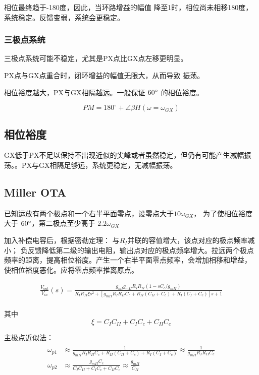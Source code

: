 \documentclass[cn,11pt,chinese,black,simple]{../elegantbook}
\begin{document}
相位最终趋于-180度，因此，当环路增益的幅值
降至1时，相位尚未相移180度，系统稳定。反馈变弱，系统会更稳定。

\subsubsection{三极点系统}

三极点系统可能不稳定，尤其是PX点比GX点左移更明显。

PX点与GX点重合时，闭环增益的幅值无限大，从而导致
振荡。

相位裕度越大，PX与GX相隔越远。一般保证 \(60^{\circ}\) 的相位裕度。

\[P M=180^{\circ}+\angle \beta H\left(\omega=\omega_{G X}\right)\]



\subsection{相位裕度}


GX低于PX不足以保持不出现近似的尖峰或者虽然稳定，但仍有可能产生减幅振荡。。PX与GX相隔足够远，系统更稳定，无减幅振荡。

\subsection{Miller OTA}

已知运放有两个极点和一个右半平面零点，设零点大于\(10 \omega_{GX}\)，  为了使相位裕度大于 \(60^{\circ}\)，第二极点至少高于 \(2.2 \omega_{GX}\)


加入补偿电容后，根据密勒定理：
与\(R_I\)并联的容值增大，该点对应的极点频率减小；
负反馈降低第二级的输出电阻，输出点对应的极点频率增大。拉远两个极点频率的距离，提高相位裕度。产生一个右半平面零点频率，会增加相移和增益，
使相位裕度恶化。应将零点频率推离原点。

\[
\begin{array}{l}
\frac{V_{o u t}}{V_{i n}}(s)=\frac{g_{m I} g_{m I I} R_{I} R_{I I}\left(1-s C_{c} / g_{m I I}\right)}{R_{I} R_{I I} \xi s^{2}+\left[g_{m I I} R_{I} R_{I I} C_{c}+R_{I I}\left(C_{I I}+C_{c}\right)+R_{I}\left(C_{I}+C_{c}\right)\right] s+1} \\
\end{array}
\]


其中
\[\xi=C_{I} C_{I I}+C_{I} C_{c}+C_{I I} C_{c}\]

主极点近似法：
\[
\begin{array}{l}
    \begin{aligned}
        
    \omega_{p 1} &\approx \frac{1}{g_{m I I} R_{I} R_{I I} C_{c}+R_{I I}\left(C_{I I}+C_{c}\right)+R_{I}\left(C_{I}+C_{c}\right)} \approx \frac{1}{g_{m I I} R_{I} R_{I I} C_{c}} \\
    \omega_{p 2} &\approx \frac{g_{m I I} C_{c}}{C_{I} C_{I I}+C_{I} C_{c}+C_{I I} C_{c}} \approx \frac{g_{m I I}}{C_{I I}}
    \end{aligned} 
\end{array}
\]
\end{document}
